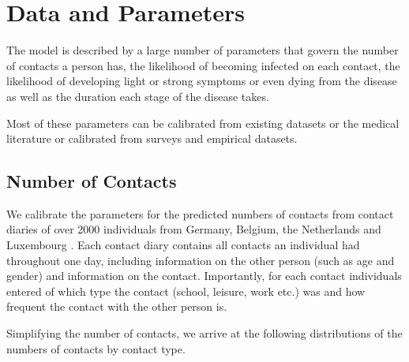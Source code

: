 \section{Data and Parameters}
\label{sec:calibration_and_estimation}

The model is described by a large number of parameters that govern the number of
contacts a person has, the likelihood of becoming infected on each contact, the
likelihood of developing light or strong symptoms or even dying from the disease as well
as the duration each stage of the disease takes.

Most of these parameters can be calibrated from existing datasets or the medical
literature or calibrated from surveys and empirical datasets.




\subsection{Number of Contacts}
\label{sub:number_of_contacts}

We calibrate the parameters for the predicted numbers of contacts from contact diaries
of over 2000 individuals from Germany, Belgium, the Netherlands and Luxembourg
\citep{Mossong2008}. Each contact diary contains all contacts an individual had
throughout one day, including information on the other person (such as age and gender)
and information on the contact. Importantly, for each contact individuals entered of
which type the contact (school, leisure, work etc.) was and how frequent the contact
with the other person is.

Simplifying the number of contacts, we arrive at the following distributions of the
numbers of contacts by contact type.


